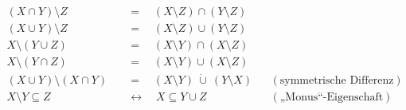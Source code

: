 \begin{align*}
    (X \cap Y) \setminus Z & \quad =\quad(X\setminus Z)\cap (Y\setminus Z) \\
    (X\cup Y)\setminus Z & \quad =\quad (X\setminus Z)\cup (Y\setminus Z) \\
        X \setminus (Y \cup Z) & \quad =\quad (X \setminus Y) \cap (X \setminus Z)\\
        X \setminus (Y \cap Z) & \quad =\quad (X \setminus Y) \cup (X \setminus Z) \\[1em]
    (X \cup Y) \setminus (X \cap Y) & \quad =\quad (X \setminus Y) \ \dot\cup\ (Y \setminus X) && (\text{symmetrische Differenz}) \\
    X\setminus Y \subseteq Z & \quad \leftrightarrow\quad X\subseteq Y\cup Z && (\text{„Monus“-Eigenschaft})
\end{align*}
\endgroup




 
